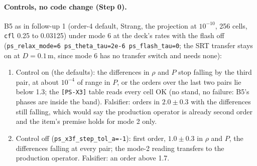 \documentclass[11pt,a4paper]{article}
\newcommand{\code}[1]{\texttt{\small #1}}
\begin{document}
\paragraph{Controls, no code change (Step 0).}  B5 as in follow-up 1
(order-4 default, Strang, the projection at $10^{-10}$, 256 cells,
\code{cfl} 0.25 to 0.03125) under mode 6 at the deck's rates with the
flash off (\code{ps\_relax\_mode=6 ps\_theta\_tau=2e-6 ps\_flash\_tau=0};
the SRT transfer stays on at $D = 0.1$\,m, since mode 6 has no transfer
switch and needs none):
\begin{enumerate}[nosep]
\item[C1.] Control on (the defaults): the differences in $\rho$ and $P$
      stop falling by the third pair, at about $10^{-4}$ of range in
      $P$, or the orders over the last two pairs lie below 1.3; the
      \code{[PS-X3]} table reads every cell OK (no stand, no failure:
      B5's phases are inside the band).  Falsifier: orders in
      $2.0\pm0.3$ with the differences still falling, which would say
      the production operator is already second order and the item's
      premise holds for mode 2 only.
\item[C2.] Control off (\code{ps\_x3f\_step\_tol\_a=-1}): first order,
      $1.0\pm0.3$ in $\rho$ and $P$, the differences falling at every
      pair; the mode-2 reading transfers to the production operator.
      Falsifier: an order above 1.7.
\end{enumerate}
\end{document}
